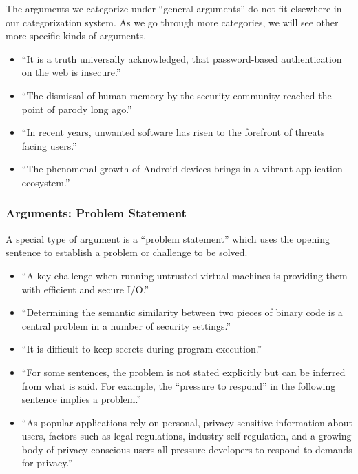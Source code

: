 \documentclass[sigconf,anonymous]{acmart}
\begin{document}
	The arguments we categorize under “general arguments” do not fit elsewhere in our categorization system. As we go through more categories, we will see other more specific kinds of arguments. 
	\begin{itemize}
		\item ``It is a truth universally acknowledged, that password-based authentication on the web is insecure.''~\cite{li2014emperor}
		
		\item 	``The dismissal of human memory by the security community reached the point of parody long ago.''~\cite{bonneau2014towards}
		
		\item ``In recent years, unwanted software has risen to the forefront of threats facing users.''~\cite{thomas2016investigating}
		
		\item 		``The phenomenal growth of Android devices brings in a vibrant application ecosystem.''~\cite{chen2015finding}
	\end{itemize}
	
	
	\subsubsection{Arguments: Problem Statement }
	
	A special type of argument is a “problem statement” which uses the opening sentence to establish a problem or challenge to be solved. 
	\begin{itemize}
		\item ``A key challenge when running untrusted virtual machines is providing them with efficient and secure I/O.''~\cite{smolyar2015securing}
		
		\item``Determining the semantic similarity between two pieces of binary code is a central problem in a number of security settings.''~\cite{egele2014blanket}
		
		\item``It is difficult to keep secrets during program execution.''~\cite{rane2015raccoon}
		
		\item	``For some sentences, the problem is not stated explicitly but can be inferred from what is said. For example, the “pressure to respond” in the following sentence implies a problem.''
		
		\item ``As popular applications rely on personal, privacy-sensitive information about users, factors such as legal regulations, industry self-regulation, and a growing body of privacy-conscious users all pressure developers to respond to demands for privacy.''~\cite{fredrikson2014zo}
	\end{itemize}
	
\end{document}
